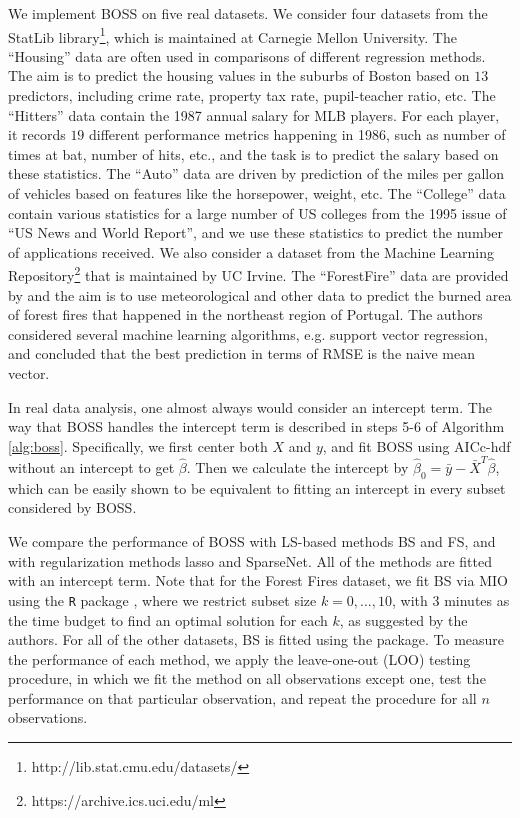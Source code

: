 We implement BOSS on five real datasets. We consider four datasets from the StatLib library\footnote{http://lib.stat.cmu.edu/datasets/}, which is maintained at Carnegie Mellon University. The ``Housing'' data are often used in comparisons of different regression methods. The aim is to predict the housing values in the suburbs of Boston based on $13$ predictors, including crime rate, property tax rate, pupil-teacher ratio, etc. The ``Hitters'' data contain the 1987 annual salary for MLB players. For each player, it records $19$ different performance metrics happening in 1986, such as number of times at bat, number of hits, etc., and the task is to predict the salary based on these statistics. The ``Auto'' data are driven by prediction of the miles per gallon of vehicles based on features like the horsepower, weight, etc. The ``College'' data contain various statistics for a large number of US colleges from the 1995 issue of ``US News and World Report'', and we use these statistics to predict the number of applications received. We also consider a dataset from the Machine Learning Repository\footnote{https://archive.ics.uci.edu/ml} that is maintained by UC Irvine. The ``ForestFire'' data are provided by \citet{cortez2007data} and the aim is to use meteorological and other data to predict the burned area of forest fires that happened in the northeast region of Portugal. The authors considered several machine learning algorithms, e.g. support vector regression, and concluded that the best prediction in terms of RMSE is the naive mean vector.


In real data analysis, one almost always would consider an intercept term. The way that BOSS handles the intercept term is described in steps 5-6 of Algorithm \ref{alg:boss}. Specifically, we first center both $X$ and $y$, and fit BOSS using AICc-hdf without an intercept to get $\hat{\beta}$. Then we calculate the intercept by $
\hat{\beta}_0=\bar{y} - \bar{X}^T \hat{\beta}$, which can be easily shown to be equivalent to fitting an intercept in every subset considered by BOSS. 

We compare the performance of BOSS with LS-based methods BS and FS, and with regularization methods lasso and SparseNet. All of the methods are fitted with an intercept term. Note that for the Forest Fires dataset, we fit BS via MIO \citep{Bertsimas2016} using the {\tt{R}} package  \citep{Hastie2017}, where we restrict subset size $k=0,\dots,10$, with $3$ minutes as the time budget to find an optimal solution for each $k$, as suggested by the authors. For all of the other datasets, BS is fitted using the  package. To measure the performance of each method, we apply the leave-one-out (LOO) testing procedure, in which we fit the method on all observations except one, test the performance on that particular observation, and repeat the procedure for all $n$ observations. 

